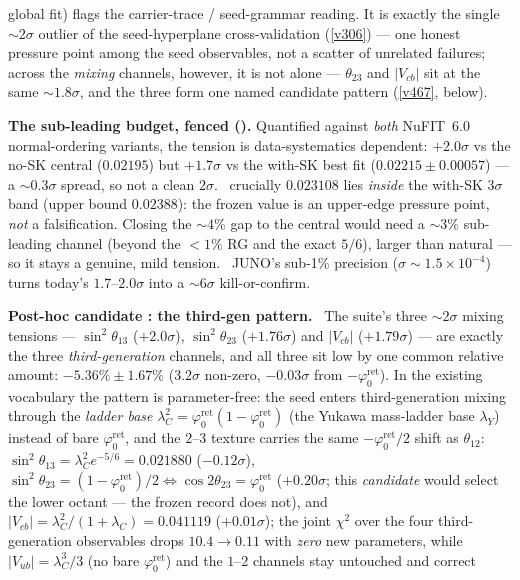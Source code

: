 \documentclass[11pt,a4paper]{article}
\newcommand{\phiz}{\varphi_0^{\mathrm{ret}}}
\newcommand{\lamC}{\lambda_C}
\theoremstyle{definition}
\begin{document}
global fit) flags the carrier-trace / seed-grammar reading. It is exactly the single ${\sim}2\sigma$ outlier of the
seed-hyperplane cross-validation (\vref{v306}) --- one honest pressure point among the seed observables, not a
scatter of unrelated failures; across the \emph{mixing} channels, however, it is not alone --- $\theta_{23}$ and
$|V_{cb}|$ sit at the same ${\sim}1.8\sigma$, and the three form one named candidate pattern (\vref{v467}, below).
\par\smallskip\noindent\textbf{The sub-leading budget, fenced ().} Quantified against
\emph{both} NuFIT~6.0 normal-ordering variants, the tension is data-systematics dependent: $+2.0\sigma$ vs the
no-SK central ($0.02195$) but $+1.7\sigma$ vs the with-SK best fit ($0.02215\pm0.00057$) --- a ${\sim}0.3\sigma$
spread, so not a clean $2\sigma$. \mE\ crucially $0.023108$ lies \emph{inside} the with-SK $3\sigma$ band (upper
bound $0.02388$): the frozen value is an upper-edge pressure point, \emph{not} a falsification. Closing the
${\sim}4\%$ gap to the central would need a ${\sim}3\%$ sub-leading channel (beyond the $<1\%$ RG and the exact
$5/6$), larger than natural --- so it stays a genuine, mild tension. \mX\ JUNO's sub-1\% precision
($\sigma\!\sim\!1.5{\times}10^{-4}$) turns today's $1.7$--$2.0\sigma$ into a ${\sim}6\sigma$ kill-or-confirm.
\par\smallskip\noindent\textbf{Post-hoc candidate \mO: the third-gen pattern.}
\
The suite's three ${\sim}2\sigma$ mixing tensions --- $\sin^2\theta_{13}$ ($+2.0\sigma$), $\sin^2\theta_{23}$
($+1.76\sigma$) and $|V_{cb}|$ ($+1.79\sigma$) --- are exactly the three \emph{third-generation} channels, and all
three sit low by one common relative amount: $-5.36\%\pm1.67\%$ ($3.2\sigma$ non-zero, $-0.03\sigma$ from $-\phiz$).
In the existing vocabulary the pattern is parameter-free: the seed enters third-generation mixing through the
\emph{ladder base} $\lamC^2=\phiz(1-\phiz)$ (the Yukawa mass-ladder base $\lambda_Y$) instead of bare $\phiz$, and
the $2$--$3$ texture carries the same $-\phiz/2$ shift as $\theta_{12}$: $\sin^2\theta_{13}=\lamC^2 e^{-5/6}=0.021880$
($-0.12\sigma$), $\sin^2\theta_{23}=(1-\phiz)/2\Leftrightarrow\cos2\theta_{23}=\phiz$ ($+0.20\sigma$; this
\emph{candidate} would select the lower octant --- the frozen record does not), and $|V_{cb}|=\lamC^2/(1+\lamC)=0.041119$
($+0.01\sigma$); the joint $\chi^2$ over the four third-generation observables drops $10.4\to0.11$ with \emph{zero}
new parameters, while $|V_{ub}|=\lamC^3/3$ (no bare $\phiz$) and the $1$--$2$ channels stay untouched and correct
\end{document}
